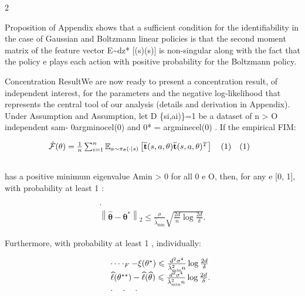 \documentclass{article}
\begin{document}
\sloppy

\begin{paracol}{2}
\RaggedRight

Proposition of Appendix shows that a sufficient condition
for the identifiability in the case of Gaussian and Boltzmann
linear policies is that the second moment matrix of the feature vector E\textasciitilde{}dz* [(s)(s)] is non-singular along with
the fact that the policy e plays each action with positive
probability for the Boltzmann policy.


Concentration ResultWe are now ready to present a concentration result, of independent interest, for the parameters
and the negative log-likelihood that represents the central
tool of our analysis (details and derivation in Appendix).
Under Assumption and Assumption, let D
\{si,ai)\}=1 be a dataset of n > O independent sam-
0argminocel(0) and 0* = argminecel(0) . If
the empirical FIM:


\begin{equation}
\begin{array} { r l } { \hat { \mathcal { F } } ( \theta ) = \frac { 1 } { n } \sum _ { i = 1 } ^ { n } \mathbb { E } _ { a \sim \pi _ { \theta } ( \cdot | s ) } \left [ \overline { \mathbf { t } } ( s, a, \theta ) \overline { \mathbf { t } } ( s, a, \theta ) ^ { T } \right ] \quad ( 1 ) } & { ( 1 ) } \\ & { \qquad }\end{array}
\end{equation}


has a positive minimum eigenvalue Amin > 0 for all 0 e O,
then, for any  e [0, 1], with probability at least 1  :


\begin{equation}
\begin{array} { r } { \cdot } \\ { \left \| \widehat { \boldsymbol { \theta } } - { \boldsymbol { \theta } } ^ { * } \right \| _ { 2 } \leqslant \frac { \sigma } { \hat { \lambda } _ { \operatorname* { m i n } } } \sqrt { \frac { 2 d } { n } \log \frac { 2 d } { \delta } }. } \end{array}
\end{equation}


Furthermore, with probability at least 1  , individually:


\begin{equation}
\begin{array} { r l } & { \quad \cdots \cdot _ { F } - \xi ( \theta ^ { * } ) \leqslant \frac { d ^ { 2 } \sigma ^ { 4 } } { \hat { \lambda } _ { \operatorname* { m i n } } ^ { 2 } n } \log \frac { 2 d } { \delta } } \\ & { \quad \widehat { \ell } ( \theta ^ { * * } ) - \widehat { \ell } ( \widehat { \theta } ) \leqslant \frac { d ^ { 2 } \sigma ^ { 4 } } { \hat { \lambda } _ { \operatorname* { m i n } } ^ { 2 } n } \log \frac { 2 d } { \delta }. } \\ & { \quad \cdot \quad \cdot \quad \cdot \quad}\end{array}
\end{equation}



\end{paracol}
\end{document}
